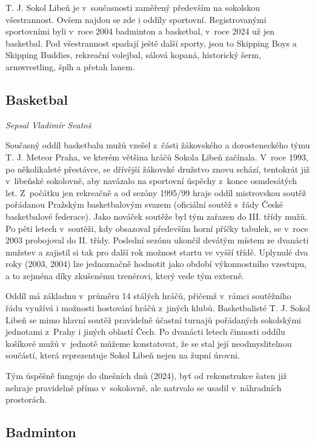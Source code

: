 \documentclass[a5paper, 11pt, twoside]{article}
\begin{document}
T. J. Sokol Libeň je v~současnosti zaměřený především na sokolskou
všestrannost. Ovšem najdou se zde i oddíly sportovní. Registrovanými
sportovními byli v~roce 2004 badminton a basketbal, v~roce 2024 už jen
basketbal. Pod všestrannost spadají ještě další sporty, jsou to Skipping
Boys a Skipping Buddies, rekreační volejbal, sálová kopaná, historický
šerm, armwrestling, šplh a přetah lanem.

\subsection{Basketbal}

\textit{Sepsal Vladimír Svatoš}

Současný oddíl basketbalu mužů vzešel z~části žákovského a
dorosteneckého týmu T. J. Meteor Praha, ve kterém většina hráčů Sokola
Libeň začínala. V~roce 1993, po několikaleté přestávce, se dřívější
žákovské družstvo znovu schází, tentokrát již v~libeňské sokolovně, aby
navázalo na sportovní úspěchy z~konce osmdesátých let. Z~počátku jen
rekreačně a od sezóny 1995/99 hraje oddíl mistrovskou soutěž pořádanou
Pražským basketbalovým svazem (oficiální soutěž s~řády České
basketbalové federace). Jako nováček soutěže byl tým zařazen do III.
třídy mužů. Po pěti letech v~soutěži, kdy obsazoval především horní
příčky tabulek, se v~roce 2003 probojoval do II. třídy. Poslední sezónu
ukončil devátým místem ze dvanácti mužstev a zajistil si tak pro další
rok možnost startu ve vyšší třídě. Uplynulé dva roky (2003, 2004) lze
jednoznačně hodnotit jako období výkonnostního vzestupu, a to zejména
díky zkušenému trenérovi, který vede tým externě.

Oddíl má základnu v~průměru 14 stálých hráčů, přičemž v~rámci soutěžního
řádu využívá i možnosti hostování hráčů z~jiných klubů. Basketbalisté T.
J. Sokol Libeň se mimo hlavní soutěž pravidelně účastní turnajů
pořádaných sokolskými jednotami z~Prahy i jiných oblastí Čech. Po
dvanácti letech činnosti oddílu košíkové mužů v~jednotě můžeme
konstatovat, že se stal její neodmyslitelnou součástí, která
reprezentuje Sokol Libeň nejen na župní úrovni.

Tým úspěšně funguje do dnešních dnů (2024), byť od rekonstrukce šaten
již nehraje pravidelně přímo v~sokolovně, ale natrvalo se usadil
v~náhradních prostorách.

\subsection{Badminton}
\end{document}
